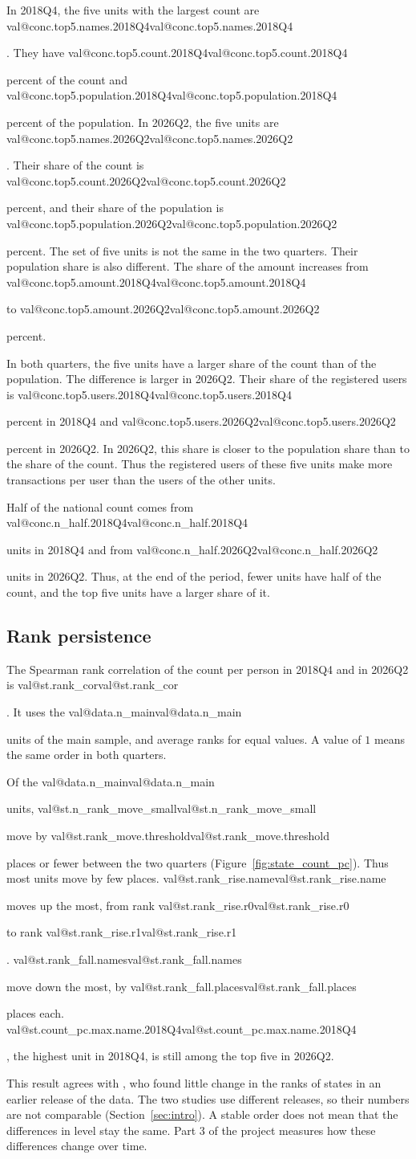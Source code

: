 \documentclass[11pt,a4paper]{article}
\makeatletter
\newcommand{\val}[1]{\ifcsname val@#1\endcsname\csname val@#1\endcsname\else
  \PackageError{study}{Unknown value key `#1'}{Run Rscript src/R/part1_study.R}\fi}
\makeatother
\begin{document}
In 2018Q4, the five units with the largest count are \val{conc.top5.names.2018Q4}. They have \val{conc.top5.count.2018Q4} percent of the count and \val{conc.top5.population.2018Q4} percent of the population. In 2026Q2, the five units are \val{conc.top5.names.2026Q2}. Their share of the count is \val{conc.top5.count.2026Q2} percent, and their share of the population is \val{conc.top5.population.2026Q2} percent. The set of five units is not the same in the two quarters. Their population share is also different. The share of the amount increases from \val{conc.top5.amount.2018Q4} to \val{conc.top5.amount.2026Q2} percent.

In both quarters, the five units have a larger share of the count than of the population. The difference is larger in 2026Q2. Their share of the registered users is \val{conc.top5.users.2018Q4} percent in 2018Q4 and \val{conc.top5.users.2026Q2} percent in 2026Q2. In 2026Q2, this share is closer to the population share than to the share of the count. Thus the registered users of these five units make more transactions per user than the users of the other units.

Half of the national count comes from \val{conc.n_half.2018Q4} units in 2018Q4 and from \val{conc.n_half.2026Q2} units in 2026Q2. Thus, at the end of the period, fewer units have half of the count, and the top five units have a larger share of it.

\subsection{Rank persistence}\label{sec:persistence}
The Spearman rank correlation of the count per person in 2018Q4 and in 2026Q2 is \val{st.rank_cor}. It uses the \val{data.n_main} units of the main sample, and average ranks for equal values. A value of $1$ means the same order in both quarters.

Of the \val{data.n_main} units, \val{st.n_rank_move_small} move by \val{st.rank_move.threshold} places or fewer between the two quarters (Figure~\ref{fig:state_count_pc}). Thus most units move by few places. \val{st.rank_rise.name} moves up the most, from rank \val{st.rank_rise.r0} to rank \val{st.rank_rise.r1}. \val{st.rank_fall.names} move down the most, by \val{st.rank_fall.places} places each. \val{st.count_pc.max.name.2018Q4}, the highest unit in 2018Q4, is still among the top five in 2026Q2.

This result agrees with \citet{reddy2024icrier}, who found little change in the ranks of states in an earlier release of the data. The two studies use different releases, so their numbers are not comparable (Section~\ref{sec:intro}). A stable order does not mean that the differences in level stay the same. Part 3 of the project measures how these differences change over time.
\end{document}
